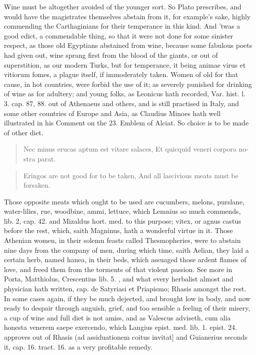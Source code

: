 Wine must be altogether avoided of the younger sort. So
Plato prescribes, and would have the magistrates themselves
abstain from it, for example's sake, highly commending the
Carthaginians for their temperance in this kind. And 'twas a good
edict, a commendable thing, so that it were not done for some sinister
respect, as those old Egyptians abstained from wine, because some
fabulous poets had given out, wine sprang first from the blood of the
giants, or out of superstition, as our modern Turks, but for
temperance, it being animae virus et vitiorum fomes, a plague itself,
if immoderately taken. Women of old for that cause, in hot
countries, were forbid the use of it; as severely punished for drinking
of wine as for adultery; and young folks, as Leonicus hath recorded,
Var. hist. l. 3. cap. 87, 88. out of Athenaeus and others, and is still
practised in Italy, and some other countries of Europe and Asia, as
Claudius Minoes hath well illustrated in his Comment on the 23. Emblem
of Alciat. So choice is to be made of other diet.

\begin{latin}
\begin{verse}
Nec minus erucas aptum est vitare salaces,
Et quicquid veneri corpora nostra parat.
\end{verse}
\end{latin}
\translationrule%
\begin{verse}%
Eringos are not good for to be taken,
And all lascivious meats must be forsaken.
\end{verse}%

Those opposite meats which ought to be used are cucumbers, melons,
purslane, water-lilies, rue, woodbine, ammi, lettuce, which Lemnius so
much commends, lib. 2, cap. 42. and Mizaldus hort. med. to this
purpose; vitex, or agnus castus before the rest, which, saith
Magninus, hath a wonderful virtue in it. Those Athenian women, in
their solemn feasts called Thesmopheries, were to abstain nine days
from the company of men, during which time, saith Aelian, they laid a
certain herb, named hanea, in their beds, which assuaged those ardent
flames of love, and freed them from the torments of that violent
passion. See more in Porta, Matthiolus, Crescentius lib. 5. \etc{}, and
what every herbalist almost and physician hath written, cap. de
Satyriasi et Priapismo; Rhasis amongst the rest. In some cases again,
if they be much dejected, and brought low in body, and now ready to
despair through anguish, grief, and too sensible a feeling of their
misery, a cup of wine and full diet is not amiss, and as Valescus
adviseth, cum alia honesta venerem saepe exercendo, which Langius
epist. med. lib. 1. epist. 24. approves out of Rhasis (ad assiduationem
coitus invitat] and Guianerius seconds it, cap. 16. tract. 16. as a
 very profitable remedy.

